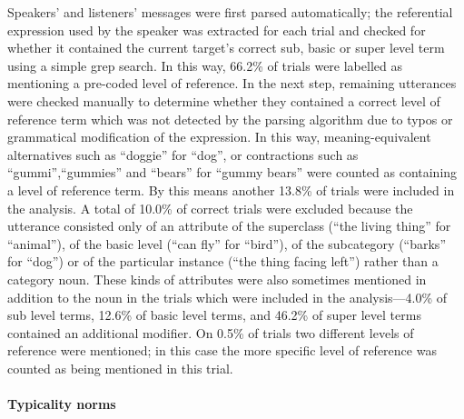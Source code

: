 \documentclass[10pt,letterpaper]{article}
\newcommand{\jd}[1]{\textcolor{Blue}{[jd: #1]}}
\begin{document}
Speakers' and listeners' messages were first parsed automatically; the referential expression used by the speaker was extracted for each trial and checked for whether it contained the current target's correct sub, basic or super level term using a simple grep search. In this way, 66.2\% of trials were labelled as mentioning a pre-coded level of reference. In the next step, remaining utterances were checked manually to determine whether they contained a correct level of reference term which was not detected by the parsing algorithm due to typos or grammatical modification of the expression. In this way, meaning-equivalent alternatives such as ``doggie'' for ``dog'',  or contractions such as ``gummi'',``gummies'' and ``bears'' for ``gummy bears'' were counted as containing a level of reference term. By this means another 13.8\% of trials were included in the analysis. A total of 10.0\% of correct trials were excluded because the utterance consisted only of an attribute of the superclass (``the living thing'' for ``animal''), of the basic level (``can fly'' for ``bird''), of the subcategory (``barks'' for ``dog'') or of the  particular instance (``the thing facing left'') rather than a category noun. These kinds of attributes were also sometimes mentioned in addition to the noun in the trials which were included in the analysis---4.0\% of sub level terms, 12.6\% of basic level terms, and 46.2\% of super level terms contained an additional modifier. 
On 0.5\% of trials two different levels of reference were mentioned; in this case the more specific level of reference was counted as being mentioned in this trial. 

\paragraph{Typicality norms}
\end{document}
